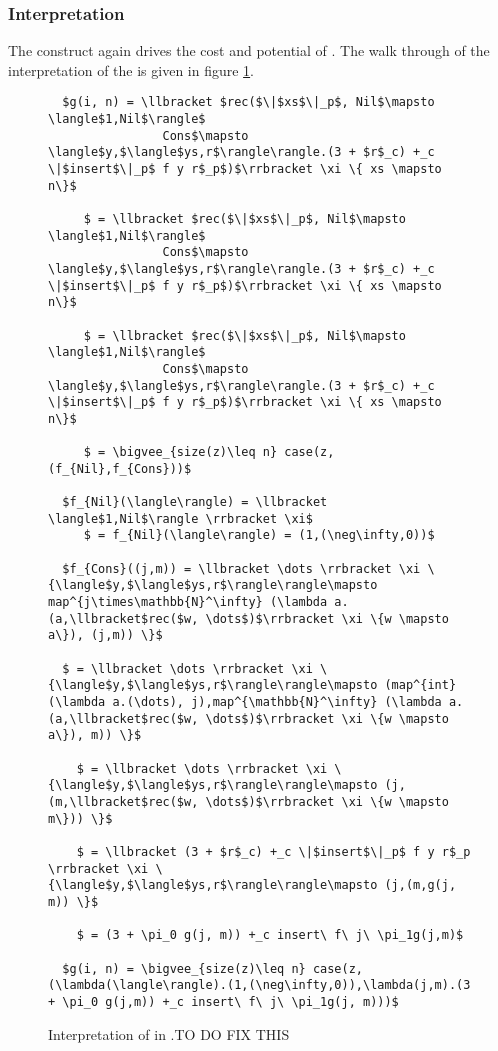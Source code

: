 \subsubsection{Interpretation}
%
The  construct again drives the cost and potential of .  The
walk through of the interpretation of the  is given in figure
\ref{fig:sort_rec_interp}.
%
\begin{figure}[H]
  \caption{Interpretation of  in .TO DO FIX THIS}
  \label{fig:sort_rec_interp}
  \begin{lstlisting}
  $g(i, n) = \llbracket $rec($\|$xs$\|_p$, Nil$\mapsto \langle$1,Nil$\rangle$
                Cons$\mapsto \langle$y,$\langle$ys,r$\rangle\rangle.(3 + $r$_c) +_c \|$insert$\|_p$ f y r$_p$)$\rrbracket \xi \{ xs \mapsto n\}$

     $ = \llbracket $rec($\|$xs$\|_p$, Nil$\mapsto \langle$1,Nil$\rangle$
                Cons$\mapsto \langle$y,$\langle$ys,r$\rangle\rangle.(3 + $r$_c) +_c \|$insert$\|_p$ f y r$_p$)$\rrbracket \xi \{ xs \mapsto n\}$

     $ = \llbracket $rec($\|$xs$\|_p$, Nil$\mapsto \langle$1,Nil$\rangle$
                Cons$\mapsto \langle$y,$\langle$ys,r$\rangle\rangle.(3 + $r$_c) +_c \|$insert$\|_p$ f y r$_p$)$\rrbracket \xi \{ xs \mapsto n\}$

     $ = \bigvee_{size(z)\leq n} case(z,(f_{Nil},f_{Cons}))$

  $f_{Nil}(\langle\rangle) = \llbracket \langle$1,Nil$\rangle \rrbracket \xi$
     $ = f_{Nil}(\langle\rangle) = (1,(\neg\infty,0))$

  $f_{Cons}((j,m)) = \llbracket \dots \rrbracket \xi \{\langle$y,$\langle$ys,r$\rangle\rangle\mapsto map^{j\times\mathbb{N}^\infty} (\lambda a.(a,\llbracket$rec($w, \dots$)$\rrbracket \xi \{w \mapsto a\}), (j,m)) \}$

  $ = \llbracket \dots \rrbracket \xi \{\langle$y,$\langle$ys,r$\rangle\rangle\mapsto (map^{int} (\lambda a.(\dots), j),map^{\mathbb{N}^\infty} (\lambda a.(a,\llbracket$rec($w, \dots$)$\rrbracket \xi \{w \mapsto a\}), m)) \}$

    $ = \llbracket \dots \rrbracket \xi \{\langle$y,$\langle$ys,r$\rangle\rangle\mapsto (j,(m,\llbracket$rec($w, \dots$)$\rrbracket \xi \{w \mapsto m\})) \}$

    $ = \llbracket (3 + $r$_c) +_c \|$insert$\|_p$ f y r$_p \rrbracket \xi \{\langle$y,$\langle$ys,r$\rangle\rangle\mapsto (j,(m,g(j, m)) \}$

    $ = (3 + \pi_0 g(j, m)) +_c insert\ f\ j\ \pi_1g(j,m)$

  $g(i, n) = \bigvee_{size(z)\leq n} case(z,(\lambda(\langle\rangle).(1,(\neg\infty,0)),\lambda(j,m).(3 + \pi_0 g(j,m)) +_c insert\ f\ j\ \pi_1g(j, m)))$
  \end{lstlisting}
\end{figure}
